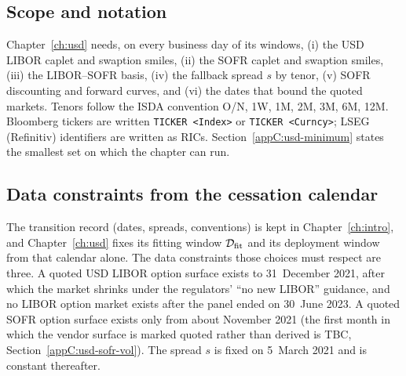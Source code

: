 
\subsection{Scope and notation}\label{appC:usd-purpose}

Chapter~\ref{ch:usd} needs, on every business day of its windows, (i) the USD LIBOR caplet and swaption smiles, (ii) the SOFR caplet and swaption smiles, (iii) the LIBOR--SOFR basis, (iv) the fallback spread $s$ by tenor, (v) SOFR discounting and forward curves, and (vi) the dates that bound the quoted markets. Tenors follow the ISDA convention O/N, 1W, 1M, 2M, 3M, 6M, 12M. Bloomberg tickers are written \texttt{TICKER <Index>} or \texttt{TICKER <Curncy>}; LSEG (Refinitiv) identifiers are written as RICs. Section~\ref{appC:usd-minimum} states the smallest set on which the chapter can run.

\subsection{Data constraints from the cessation calendar}\label{appC:usd-calendar}

The transition record (dates, spreads, conventions) is kept in Chapter~\ref{ch:intro}, and Chapter~\ref{ch:usd} fixes its fitting window $\mathcal D_{\mathrm{fit}}$ and its deployment window from that calendar alone. The data constraints those choices must respect are three. A quoted USD LIBOR option surface exists to 31~December 2021, after which the market shrinks under the regulators' ``no new LIBOR'' guidance, and no LIBOR option market exists after the panel ended on 30~June 2023. A quoted SOFR option surface exists only from about November 2021 (the first month in which the vendor surface is marked quoted rather than derived is TBC, Section~\ref{appC:usd-sofr-vol}). The spread $s$ is fixed on 5~March 2021 and is constant thereafter.



